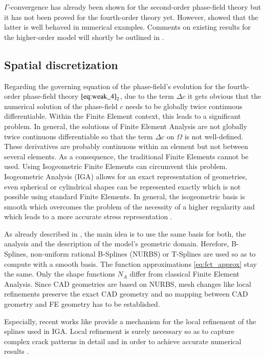 $\Gamma$-convergence has already been shown for the second-order phase-field theory but it has not been proved for the fourth-order theory yet. However, \citet{02_PF_HO_brittle} showed that the latter is well behaved in numerical examples. Comments on existing results for the higher-order model will shortly be outlined in .



\subsection{Spatial discretization} \label{sec:space_discr}
Regarding the governing equation of the phase-field's evolution for the fourth-order phase-field theory $\eqref{eq:weak_4}_{2}$, due to the term $\Delta c$ it gets obvious that the numerical solution of the phase-field $c$ needs to be globally twice continuous differentiable. Within the Finite Element context, this leads to a significant problem. In general, the solutions of Finite Element Analysis are not globally twice continuous differentiable so that the term $\Delta c$ on $\Omega$ is not well-defined. These derivatives are probably continuous within an element but not between several elements. As a consequence, the traditional Finite Elements cannot be used. Using Isogeometric Finite Elements can circumvent this problem. Isogeometric Analysis (IGA) allows for an exact representation of geometries, even spherical or cylindrical shapes can be represented exactly which is not possible using standard Finite Elements. In general, the isogeometric basis is smooth which overcomes the problem of the necessity of a higher regularity and which leads to a more accurate stress representation \cite{01_PF_dyn_brittle}.

As already described in , the main idea is to use the same basis for both, the analysis and the description of the model's geometric domain. Herefore, B-Splines, non-uniform rational B-Splines (NURBS) or T-Splines are used so as to compute with a smooth basis. The function approximations \eqref{eq:fct_approx} stay the same. Only the shape functions $N_{A}$ differ from classical Finite Element Analysis. Since CAD geometries are based on NURBS, mesh changes like local refinements preserve the exact CAD geometry and no mapping between CAD geometry and FE geometry has to be established. \citep{11_PF_DissBorden}

Especially, recent works like \cite{17_IGA_LRNURBS} provide a mechanism for the local refinement of the splines used in IGA. Local refinement is surely necessary so as to capture complex crack patterns in detail and in order to achieve accurate numerical results \cite{01_PF_dyn_brittle}.


